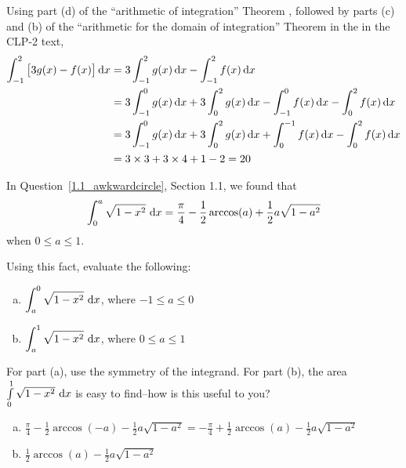 \begin{solution}
Using part (d) of the ``arithmetic of integration'' Theorem  ,
followed by parts (c) and (b) of the ``arithmetic for the domain of integration'' Theorem
   in the
 in the CLP-2 text,
\begin{align*}
\int_{-1}^2 \big[3g(x)-f(x)\big]\,\mathrm{d}x
&=3\int_{-1}^2 g(x)\,\mathrm{d}x-\int_{-1}^2 f(x)\,\mathrm{d}x \\
&=3\int_{-1}^0 g(x)\,\mathrm{d}x+3\int_0^2 g(x)\,\mathrm{d}x
-\int_{-1}^0 f(x)\,\mathrm{d}x-\int_0^2 f(x)\,\mathrm{d}x \\
&=3\int^0_{-1} g(x)\,\mathrm{d}x+3\int_0^2 g(x)\,\mathrm{d}x
+\int_0^{-1} f(x)\,\mathrm{d}x-\int_0^2 f(x)\,\mathrm{d}x \\
&=3\times 3+3\times 4 + 1 - 2 = 20
\end{align*}

\end{solution}
\begin{question} In Question~\ref{1.1_awkwardcircle}, Section 1.1, we found that
\[\int_0^a\sqrt{1-x^2}\ \dee{x}=\frac{\pi}{4} - \frac{1}{2}\arccos(a)+\frac{1}{2}a\sqrt{1-a^2}\]
when $0\le a\le 1$.

Using this fact, evaluate the following:
\begin{enumerate}[(a)]
\item $\displaystyle\int_{a}^0 \sqrt{1-x^2}\ \dee{x}$, where $-1 \leq a \leq 0$
\item $\displaystyle\int_{a}^1 \sqrt{1-x^2}\ \dee{x}$, where $0 \leq a \leq 1$
\end{enumerate}
\end{question}
\begin{hint} For part (a), use the symmetry of the integrand. For part (b), the area $\int	\limits_{0}^1 \sqrt{1-x^2}\ \dee{x}$ is easy to find--how is this useful to you?
\end{hint}
\begin{answer}
\begin{enumerate}[(a)]
\item $\frac{\pi}{4} - \frac{1}{2}\arccos(-a)-\frac{1}{2}a\sqrt{1-a^2}
=-\frac{\pi}{4} + \frac{1}{2}\arccos(a)-\frac{1}{2}a\sqrt{1-a^2}$
\item $\frac{1}{2}\arccos(a)-\frac{1}{2}a\sqrt{1-a^2}$
\end{enumerate}
\end{answer}
